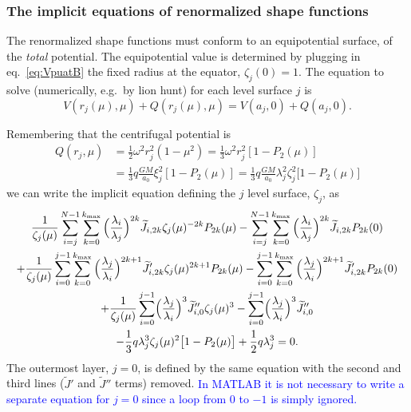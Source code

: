 \documentclass[amsmath,amsfonts,rmp,letterpaper]{revtex4}
\newcommand{\sub}[1]{_{\text{#1}}} %
\newcommand{\ptk}{P_{2k}}
\newcommand{\kmax}{k\sub{max}}
\newcommand{\ML}[1]{{\textcolor{blue}{#1}}}
\newcommand{\Jtil}{\widetilde{J}}
\newcommand{\sumkmax}{\sum_{k=0}^{\kmax}}
\begin{document}
\subsubsection{The implicit equations of renormalized shape functions}

The renormalized shape functions must conform to an equipotential surface, of the
\emph{total} potential. The equipotential value is determined by plugging in
eq.~\eqref{eq:VpuatB} the fixed radius at the equator, $\zeta_j(0)=1$. The
equation to solve (numerically, e.g.~by lion hunt) for each level surface $j$ is
\begin{equation}
V(r_j(\mu),\mu) + Q(r_j(\mu),\mu) = V(a_j,0) + Q(a_j,0).
\end{equation}

Remembering that the centrifugal potential is
\begin{equation*}
\begin{split}
Q(r_j,\mu) &= \frac{1}{2}\omega^2r_j^2(1-\mu^2) =
\frac{1}{3}\omega^2r_j^2[1 - P_2(\mu)] \\
&= \frac{1}{3}q\frac{GM}{a_0}\xi_j^2[1 - P_2(\mu)] =
\frac{1}{3}q\frac{GM}{a_0}\lambda_j^2\zeta_j^2\bigl[1 - P_2(\mu)\bigr]
\end{split}
\end{equation*}
we can write the implicit equation defining the $j$ level surface, $\zeta_j$, as
\begin{multline}\label{eq:implicit_zeta_equation}
\frac{1}{\zeta_j(\mu)}
\sum_{i=j}^{N-1}\sumkmax{}\Bigl(\frac{\lambda_i}{\lambda_j}\Bigr)^{2k}
\Jtil_{i,2k}\zeta_j(\mu)^{-2k}\ptk(\mu) -
\sum_{i=j}^{N-1}\sumkmax{}\Bigl(\frac{\lambda_i}{\lambda_j}\Bigr)^{2k}
\Jtil_{i,2k}\ptk(0)\\
+\frac{1}{\zeta_j(\mu)}
\sum_{i=0}^{j-1}\sumkmax{}\Bigl(\frac{\lambda_j}{\lambda_i}\Bigr)^{2k+1}
\Jtil'_{i,2k}\zeta_j(\mu)^{2k+1}\ptk(\mu) -
\sum_{i=0}^{j-1}\sumkmax{}\Bigl(\frac{\lambda_j}{\lambda_i}\Bigr)^{2k+1}
\Jtil'_{i,2k}\ptk(0)\\
+\frac{1}{\zeta_j(\mu)}
\sum_{i=0}^{j-1}\Bigl(\frac{\lambda_j}{\lambda_i}\Bigr)^3
\Jtil''_{i,0}\zeta_j(\mu)^3 -
\sum_{i=0}^{j-1}\Bigl(\frac{\lambda_j}{\lambda_i}\Bigr)^3
\Jtil''_{i,0}\\
-\frac{1}{3}q\lambda_j^3\zeta_j(\mu)^2\bigl[1 - P_2(\mu)\bigr] +
\frac{1}{2}q\lambda_j^3 = 0.
\end{multline}
The outermost layer, $j=0$, is defined by the same equation with the second and
third lines ($\Jtil'$ and $\Jtil''$ terms) removed. \ML{In MATLAB it is not
necessary to write a separate equation for $j=0$ since a loop from $0$ to $-1$ is
simply ignored.}
\end{document}
